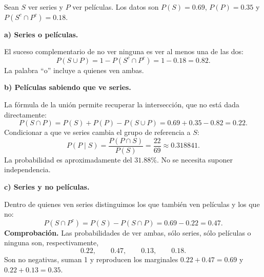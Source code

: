 Sean $S$ ver series y $P$ ver películas. Los datos son $P(S)=0.69$, $P(P)=0.35$ y $P(S^c\cap P^c)=0.18$.

\textbf{a) Series o películas.}\par\nopagebreak[4]

El suceso complementario de no ver ninguna es ver al menos una de las dos:
\[
P(S\cup P)=1-P(S^c\cap P^c)=1-0.18=\boxed{0.82}.
\]
La palabra ``o'' incluye a quienes ven ambas.

\textbf{b) Películas sabiendo que ve series.}\par\nopagebreak[4]

La fórmula de la unión permite recuperar la intersección, que no está dada directamente:
\[
P(S\cap P)=P(S)+P(P)-P(S\cup P)
=0.69+0.35-0.82=0.22.
\]
Condicionar a que ve series cambia el grupo de referencia a $S$:
\[
P(P\mid S)=\frac{P(P\cap S)}{P(S)}
=\boxed{\frac{22}{69}\approx0.318841}.
\]
La probabilidad es aproximadamente del $31.88\%$. No se necesita suponer independencia.

\textbf{c) Series y no películas.}\par\nopagebreak[4]

Dentro de quienes ven series distinguimos los que también ven películas y los que no:
\[
P(S\cap P^c)=P(S)-P(S\cap P)=0.69-0.22=\boxed{0.47}.
\]
\textbf{Comprobación.} Las probabilidades de ver ambas, sólo series, sólo películas o ninguna son, respectivamente,
\[
0.22,\qquad0.47,\qquad0.13,\qquad0.18.
\]
Son no negativas, suman 1 y reproducen los marginales $0.22+0.47=0.69$ y $0.22+0.13=0.35$.
